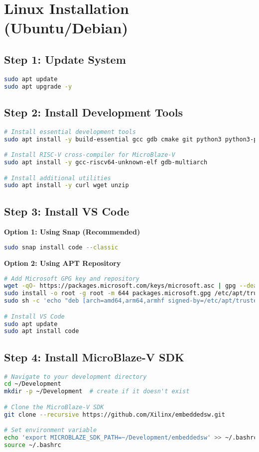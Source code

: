 \documentclass[11pt,a4paper]{article}
\begin{document}
\section{Linux Installation (Ubuntu/Debian)}

\subsection{Step 1: Update System}
\begin{lstlisting}[language=bash]
sudo apt update
sudo apt upgrade -y
\end{lstlisting}

\subsection{Step 2: Install Development Tools}
\begin{lstlisting}[language=bash]
# Install essential development tools
sudo apt install -y build-essential gcc gdb cmake git python3 python3-pip

# Install RISC-V cross-compiler for MicroBlaze-V
sudo apt install -y gcc-riscv64-unknown-elf gdb-multiarch

# Install additional utilities
sudo apt install -y curl wget unzip
\end{lstlisting}

\subsection{Step 3: Install VS Code}
\textbf{Option 1: Using Snap (Recommended)}
\begin{lstlisting}[language=bash]
sudo snap install code --classic
\end{lstlisting}

\textbf{Option 2: Using APT Repository}
\begin{lstlisting}[language=bash]
# Add Microsoft GPG key and repository
wget -qO- https://packages.microsoft.com/keys/microsoft.asc | gpg --dearmor > packages.microsoft.gpg
sudo install -o root -g root -m 644 packages.microsoft.gpg /etc/apt/trusted.gpg.d/
sudo sh -c 'echo "deb [arch=amd64,arm64,armhf signed-by=/etc/apt/trusted.gpg.d/packages.microsoft.gpg] https://packages.microsoft.com/repos/code stable main" > /etc/apt/sources.list.d/vscode.list'

# Install VS Code
sudo apt update
sudo apt install code
\end{lstlisting}

\subsection{Step 4: Install MicroBlaze-V SDK}
\begin{lstlisting}[language=bash]
# Navigate to your development directory
cd ~/Development
mkdir -p ~/Development  # create if it doesn't exist

# Clone the MicroBlaze-V SDK
git clone --recursive https://github.com/Xilinx/embeddedsw.git

# Set environment variable
echo 'export MICROBLAZE_SDK_PATH=~/Development/embeddedsw' >> ~/.bashrc
source ~/.bashrc
\end{lstlisting}
\end{document}

